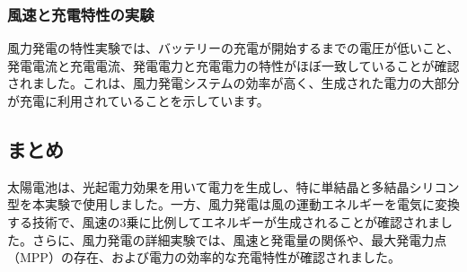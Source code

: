 \documentclass[a4paper,11pt,xelatex,ja=standard]{bxjsarticle}
\begin{document}
        \subsubsection{風速と充電特性の実験}
            風力発電の特性実験では、バッテリーの充電が開始するまでの電圧が低いこと、発電電流と充電電流、発電電力と充電電力の特性がほぼ一致していることが確認されました。これは、風力発電システムの効率が高く、生成された電力の大部分が充電に利用されていることを示しています。

    \subsection{まとめ}
        太陽電池は、光起電力効果を用いて電力を生成し、特に単結晶と多結晶シリコン型を本実験で使用しました。一方、風力発電は風の運動エネルギーを電気に変換する技術で、風速の3乗に比例してエネルギーが生成されることが確認されました。さらに、風力発電の詳細実験では、風速と発電量の関係や、最大発電力点（MPP）の存在、および電力の効率的な充電特性が確認されました。
\end{document}
